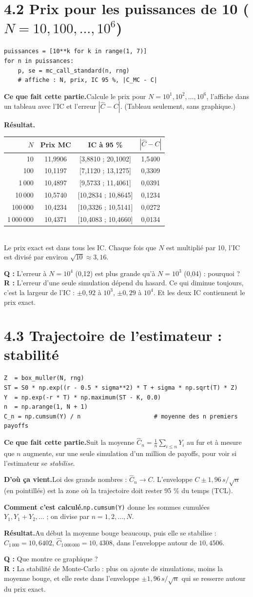 \documentclass[11pt,a4paper]{article}
\newcommand{\quoi}[1]{\par\noindent\textbf{\color{bleu}Ce que fait cette partie.}\enspace #1\par}
\newcommand{\source}[1]{\par\noindent\textbf{\color{orange}D'où ça vient.}\enspace #1\par}
\newcommand{\calcul}[1]{\par\noindent\textbf{\color{bleu}Comment c'est calculé.}\enspace #1\par}
\newcommand{\resultat}[1]{\par\noindent\textbf{\color{vert}Résultat.}\enspace #1\par}
\newcommand{\prof}[2]{\begin{tcolorbox}[colback=orange!6,colframe=orange!80,boxrule=0.4pt,arc=2pt,left=5pt,right=5pt,top=2pt,bottom=2pt]\small\textbf{Q :} #1\\[1pt]\textbf{R :} #2\end{tcolorbox}}
\newcommand{\sect}[1]{\clearpage\section{#1}}
\begin{document}
\sect{4.2 Prix pour les puissances de 10 ($N = 10, 100, \dots, 10^6$)}
\begin{lstlisting}
puissances = [10**k for k in range(1, 7)]
for n in puissances:
    p, se = mc_call_standard(n, rng)
    # affiche : N, prix, IC 95 %, |C_MC - C|
\end{lstlisting}
\quoi{Calcule le prix pour $N = 10^1, 10^2, \dots, 10^6$, l'affiche dans un tableau avec l'IC et l'erreur $|\hat C - C|$. (Tableau seulement, sans graphique.)}
\resultat{\small
\begin{tabular}{rccc}
\toprule
$N$ & Prix MC & IC à 95 \% & $|\hat C - C|$ \\
\midrule
10 & 11,9906 & [3,8810 ; 20,1002] & 1,5400 \\
100 & 10,1197 & [7,1120 ; 13,1275] & 0,3309 \\
1\,000 & 10,4897 & [9,5733 ; 11,4061] & 0,0391 \\
10\,000 & 10,5740 & [10,2834 ; 10,8645] & 0,1234 \\
100\,000 & 10,4234 & [10,3326 ; 10,5141] & 0,0272 \\
1\,000\,000 & 10,4371 & [10,4083 ; 10,4660] & 0,0134 \\
\bottomrule
\end{tabular}\\
Le prix exact est dans tous les IC. Chaque fois que $N$ est multiplié par 10, l'IC est divisé par environ $\sqrt{10}\approx3{,}16$.}
\prof{L'erreur à $N = 10^4$ (0,12) est plus grande qu'à $N = 10^3$ (0,04) : pourquoi ?}{L'erreur d'une seule simulation dépend du hasard. Ce qui diminue toujours, c'est la largeur de l'IC : $\pm0{,}92$ à $10^3$, $\pm0{,}29$ à $10^4$. Et les deux IC contiennent le prix exact.}

\sect{4.3 Trajectoire de l'estimateur : stabilité}
\begin{lstlisting}
Z  = box_muller(N, rng)
ST = S0 * np.exp((r - 0.5 * sigma**2) * T + sigma * np.sqrt(T) * Z)
Y  = np.exp(-r * T) * np.maximum(ST - K, 0.0)
n  = np.arange(1, N + 1)
C_n = np.cumsum(Y) / n                     # moyenne des n premiers payoffs
\end{lstlisting}
\quoi{Suit la moyenne $\hat C_n = \frac1n\sum_{i\le n}Y_i$ au fur et à mesure que $n$ augmente, sur une seule simulation d'un million de payoffs, pour voir si l'estimateur se \emph{stabilise}.}
\source{Loi des grands nombres : $\hat C_n\to C$. L'enveloppe $C\pm1{,}96\,s/\sqrt n$ (en pointillés) est la zone où la trajectoire doit rester 95 \% du temps (TCL).}
\calcul{\texttt{np.cumsum(Y)} donne les sommes cumulées $Y_1, Y_1+Y_2, \dots$ ; on divise par $n = 1, 2, \dots, N$.}
\resultat{Au début la moyenne bouge beaucoup, puis elle se stabilise : $\hat C_{1\,000} = 10{,}6402$, $\hat C_{1\,000\,000} = 10{,}4308$, dans l'enveloppe autour de $10{,}4506$.}
\prof{Que montre ce graphique ?}{La stabilité de Monte-Carlo : plus on ajoute de simulations, moins la moyenne bouge, et elle reste dans l'enveloppe $\pm1{,}96\,s/\sqrt n$ qui se resserre autour du prix exact.}
\end{document}
